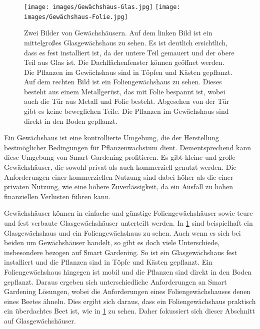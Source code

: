 \begin{figure}[!htb]
	\centering
	\texttt{[image: images/Gewächshaus-Glas.jpg]}
	\texttt{[image: images/Gewächshaus-Folie.jpg]}
	\caption[Bilder eines Glasgewächshauses und eines Foliengewächshauses.]{
		Zwei Bilder von Gewächshäusern.
		Auf dem linken Bild ist ein mittelgroßes Glasgewächshaus zu sehen.
		Es ist deutlich ersichtlich, dass es fest installiert ist, da der untere Teil gemauert und der obere Teil aus Glas ist.
		Die Dachflächenfenster können geöffnet werden.
		Die Pflanzen im Gewächshaus sind in Töpfen und Kästen gepflanzt.\\
		Auf dem rechten Bild ist ein Foliengewächshaus zu sehen.
		Dieses besteht aus einem Metallgerüst, das mit Folie bespannt ist, wobei auch die Tür aus Metall und Folie besteht.
		Abgesehen von der Tür gibt es keine beweglichen Teile.
		Die Pflanzen im Gewächshaus sind direkt in den Boden gepflanzt.\footnotemark
		}
	\label{pic:gewächshaus}
\end{figure}

Ein Gewächshaus ist eine kontrollierte Umgebung, die der Herstellung bestmöglicher Bedingungen für Pflanzenwachstum dient.
Dementsprechend kann diese Umgebung von Smart Gardening profitieren.
Es gibt kleine und große Gewächshäuser, die sowohl privat als auch kommerziell genutzt werden.
Die Anforderungen einer kommerziellen Nutzung sind dabei höher als die einer privaten Nutzung, wie eine höhere Zuverlässigkeit, da ein Ausfall zu hohen finanziellen Verlusten führen kann.

Gewächshäuser können in einfache und günstige Foliengewächshäuser sowie teure und fest verbaute Glasgewächshäuser unterteilt werden.
In \cref{pic:gewächshaus} sind beispielhaft ein Glasgewächshaus und ein Foliengewächshaus zu sehen.
Auch wenn es sich bei beiden um Gewächshäuser handelt, so gibt es doch viele Unterschiede, insbesondere bezogen auf Smart Gardening.
So ist ein Glasgewächshaus fest installiert und die Pflanzen sind in Töpfe und Kästen gepflanzt.
Ein Foliengewächshaus hingegen ist mobil und die Pflanzen sind direkt in den Boden gepflanzt.
Daraus ergeben sich unterschiedliche Anforderungen an Smart Gardening Lösungen, wobei die Anforderungen eines Foliengewächshauses denen eines Beetes ähneln.
Dies ergibt sich daraus, dass ein Foliengewächshaus praktisch ein überdachtes Beet ist, wie in \cref{pic:gewächshaus} zu sehen.
Daher fokussiert sich dieser Abschnitt auf Glasgewächshäuser.


